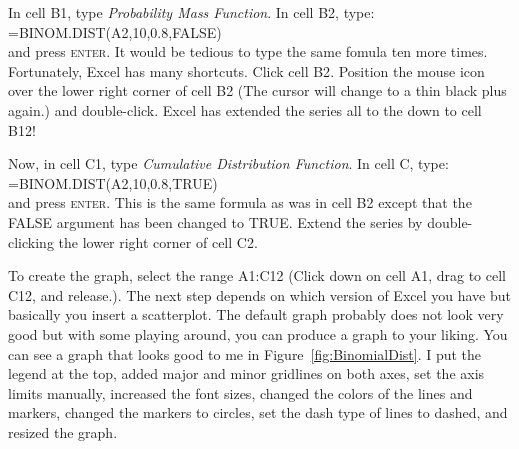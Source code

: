 \documentclass[nohyper,justified,marginals=raggedright]{tufte-book}\usepackage[]{graphicx}\usepackage[]{color}
\begin{document}
In cell \textsf{B1}, type \emph{Probability Mass Function}. In cell \textsf{B2}, type:\\
\textsf{=BINOM.DIST({\color{xBlue}A2},10,0.8,FALSE)}\\
and press \textsc{enter}. It would be tedious to type the same fomula ten more times. Fortunately, Excel has many shortcuts. Click cell \textsf{B2}. Position the mouse icon over the lower right corner of cell \textsf{B2} (The cursor will change to a thin black plus again.) and double-click. Excel has extended the series all to the down to cell \textsf{B12}! 

Now, in cell \textsf{C1}, type \emph{Cumulative Distribution Function}. In cell \textsf{C}, type:\\
\textsf{=BINOM.DIST({\color{xBlue}A2},10,0.8,TRUE)}\\
and press \textsc{enter}. This is the same formula as was in cell \textsf{B2} except that the \textsf{FALSE} argument has been changed to \textsf{TRUE}. Extend the series by double-clicking the lower right corner of cell \textsf{C2}. 

To create the graph, select the range \textsf{A1:C12} (Click down on cell \textsf{A1}, drag to cell \textsf{C12}, and release.). The next step depends on which version of Excel you have but basically you insert a scatterplot. The default graph probably does not look very good but with some playing around, you can produce a graph to your liking. You can see a graph that looks good to me in Figure~\ref{fig:BinomialDist}. I put the legend at the top, added major and minor gridlines on both axes, set the axis limits manually, increased the font sizes, changed the colors of the lines and markers, changed the markers to circles, set the dash type of lines to dashed, and resized the graph.
\end{document}
